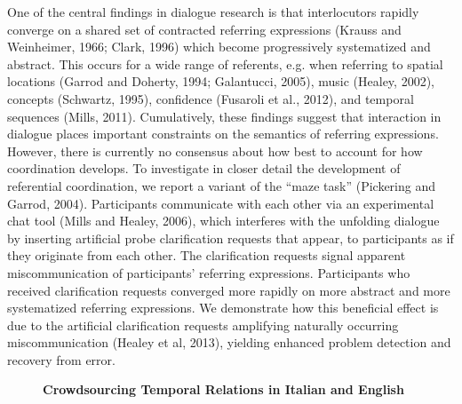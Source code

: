 \documentclass[10pt, a4paper, twopage, headinclude, footinclude, BCOR5mm]{book}
\begin{document}
\begin{table}[t!]
\end{table} 
\noindent
One of the central findings in dialogue research is that interlocutors rapidly converge on a shared set of contracted referring expressions (Krauss and Weinheimer, 1966; Clark, 1996) which become progressively systematized and abstract. This occurs for a wide range of referents, e.g. when referring to spatial locations (Garrod and Doherty, 1994; Galantucci, 2005), music (Healey, 2002), concepts (Schwartz, 1995), confidence (Fusaroli et al., 2012), and temporal sequences (Mills, 2011). Cumulatively, these findings suggest that interaction in dialogue places important constraints on the semantics of referring expressions. However, there is currently no consensus about how best to account for how coordination develops.    To investigate in closer detail the development of referential coordination, we report a variant of the “maze task” (Pickering and Garrod, 2004). Participants communicate with each other via an experimental chat tool (Mills and Healey, 2006), which interferes with the unfolding dialogue by inserting artificial probe clarification requests that appear, to participants as if they originate from each other. The clarification requests signal apparent miscommunication of participants’ referring expressions. Participants who received clarification requests converged more rapidly on more abstract and more systematized referring expressions. We demonstrate how this beneficial effect is due to the artificial clarification requests amplifying naturally occurring miscommunication (Healey et al, 2013),  yielding enhanced problem detection and recovery from error.  

\newpage

\begin{figure}[t!]
\centering
\large\textbf{Crowdsourcing Temporal Relations in Italian and English}
\vspace*{0.5cm}
\end{figure}
\end{document}
